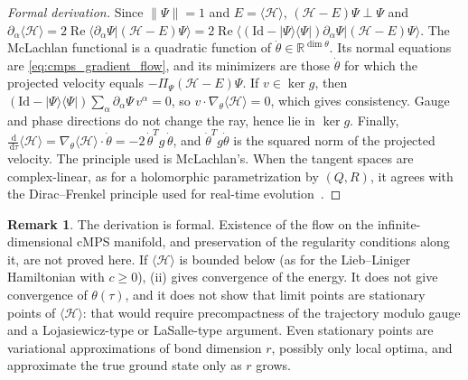 \documentclass[11pt,a4paper,reqno]{amsart}
\theoremstyle{definition}
\newtheorem{remark}[theorem]{Remark}
\numberwithin{equation}{section}
\providecommand{\R}{\mathbb{R}}
\newcommand{\Id}{\mathrm{Id}}
\newcommand{\dif}{\,\mathrm{d}}
\providecommand{\R}{\mathbb{R}}
\begin{document}
\begin{proof}[Formal derivation]
Since $\|\Psi\| = 1$ and $E = \langle \mathcal{H}\rangle$, $(\mathcal{H} - E)\Psi \perp \Psi$ and $\partial_\alpha \langle \mathcal{H} \rangle = 2\operatorname{Re}\langle \partial_\alpha \Psi | (\mathcal{H} - E)\Psi\rangle = 2\operatorname{Re}\langle (\Id - |\Psi\rangle\langle\Psi|)\partial_\alpha \Psi | (\mathcal{H} - E)\Psi\rangle$. The McLachlan functional is a quadratic function of $\dot\theta \in \R^{\dim\theta}$. Its normal equations are \eqref{eq:cmps_gradient_flow}, and its minimizers are those $\dot\theta$ for which the projected velocity equals $-\Pi_\Psi(\mathcal{H} - E)\Psi$. If $v \in \ker g$, then $(\Id - |\Psi\rangle\langle\Psi|)\sum_\alpha \partial_\alpha\Psi\, v^\alpha = 0$, so $v \cdot \nabla_\theta\langle\mathcal{H}\rangle = 0$, which gives consistency. Gauge and phase directions do not change the ray, hence lie in $\ker g$. Finally, $\frac{\dif}{\dif\tau}\langle\mathcal{H}\rangle = \nabla_\theta\langle\mathcal{H}\rangle \cdot \dot\theta = -2\,\dot\theta^T g\,\dot\theta$, and $\dot\theta^T g \dot\theta$ is the squared norm of the projected velocity. The principle used is McLachlan's. When the tangent spaces are complex-linear, as for a holomorphic parametrization by $(Q,R)$, it agrees with the Dirac--Frenkel principle used for real-time evolution~\cite{haegeman2011tdvp}.
\end{proof}

\begin{remark}
The derivation is formal. Existence of the flow on the infinite-dimensional cMPS manifold, and preservation of the regularity conditions along it, are not proved here. If $\langle\mathcal{H}\rangle$ is bounded below (as for the Lieb--Liniger Hamiltonian with $c \ge 0$), (ii) gives convergence of the energy. It does not give convergence of $\theta(\tau)$, and it does not show that limit points are stationary points of $\langle\mathcal{H}\rangle$: that would require precompactness of the trajectory modulo gauge and a Lojasiewicz-type or LaSalle-type argument. Even stationary points are variational approximations of bond dimension $r$, possibly only local optima, and approximate the true ground state only as $r$ grows.
\end{remark}
\end{document}
